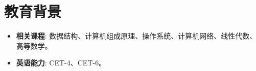 
\section{教育背景}
\renewcommand{\cvsectionmarker}{}

\begin{itemize}[itemsep=0.5ex, leftmargin=2em]
\cvbodyfont
    \item \textbf{相关课程}: 数据结构、计算机组成原理、操作系统、计算机网络、线性代数、高等数学。
    \item \textbf{英语能力}: CET-4、CET-6。
\end{itemize}
